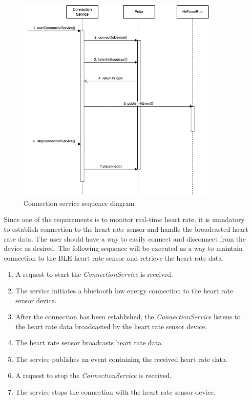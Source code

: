\begin{figure}[H]
    \centering
    \includegraphics[width=0.9\textwidth]{diagrams/connection-service-onStart.drawio.png}
    \caption{Connection service sequence diagram}
    \label{fig:connection_diagram}
\end{figure}
Since one of the requirements is to monitor real-time heart rate, it is mandatory to establish connection to the heart rate sensor and handle the broadcasted heart rate data. The user should have a way to easily connect and disconnect from the device as desired.
The following sequence will be executed as a way to maintain connection to the BLE heart rate sensor and retrieve the heart rate data.
\begin{enumerate}
    \item A request to start the \emph{ConnectionService} is received.
    \item The service initiates a bluetooth low energy connection to the heart rate sensor device.
    \item After the connection has been established, the \emph{ConnectionService} listens to the heart rate data broadcasted by the heart rate sensor device.
    \item The heart rate sensor broadcasts heart rate data.
    \item The service publishes an event containing the received heart rate data.
    \item A request to stop the \emph{ConnectionService} is received.
    \item The service stops the connection with the heart rate sensor device.
\end{enumerate}

